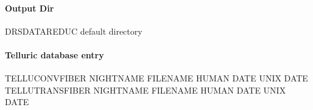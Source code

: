 \documentclass[a4paper,10pt,english]{report}
\begin{document}
\paragraph{Output Dir}
\label{\detokenize{user/spirou/recipes/make_template:output-dir}}
\begin{sphinxVerbatim}[commandchars=\\\{\}]
DRS\PYGZus{}DATA\PYGZus{}REDUC    default  directory
\end{sphinxVerbatim}


\paragraph{Telluric database entry}
\label{\detokenize{user/spirou/recipes/make_template:telluric-database-entry}}
\begin{sphinxVerbatim}[commandchars=\\\{\}]
TELLU\PYGZus{}CONV\PYGZus{}FIBER NIGHT\PYGZus{}NAME FILENAME HUMAN DATE UNIX DATE
TELLU\PYGZus{}TRANS\PYGZus{}FIBER NIGHT\PYGZus{}NAME FILENAME HUMAN DATE UNIX DATE
\end{sphinxVerbatim}
\end{document}
